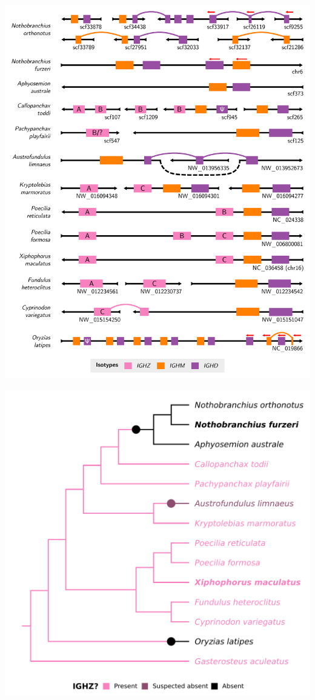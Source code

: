 \documentclass[presentation]{beamer}
\begin{document}
\begin{frame}
\centering
\includegraphics[height=\textheight]{figs/pdf/extra/multispecies-ch-regions}
\end{frame}

\begin{frame}
\centering
\includegraphics[height=\textheight]{figs/pdf/extra/species-tree-large-ighz}
\end{frame}
\end{document}
